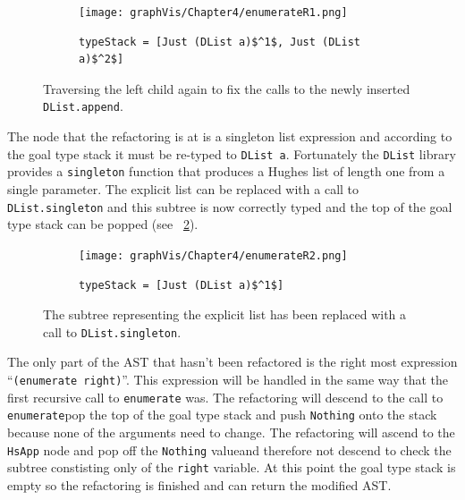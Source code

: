 \begin{figure}[t]
	\begin{subfigure}{\linewidth}
		\texttt{[image: graphVis/Chapter4/enumerateR1.png]}
	\end{subfigure}\par\medskip

	\begin{subfigure}{\linewidth}
		\begin{lstlisting}[mathescape]
			typeStack = [Just (DList a)$^1$, Just (DList a)$^2$]
		\end{lstlisting}
	\end{subfigure}\par\medskip
\caption{Traversing the left child again to fix the calls to the newly inserted \texttt{DList.append}.}
\label{enumStateR1}
\end{figure}

The node that the refactoring is at is a singleton list expression and according to the goal type stack it must be re-typed to \texttt{DList a}. Fortunately the \texttt{DList} library provides a \texttt{singleton} function that produces a Hughes list of length one from a single parameter. The explicit list can be replaced with a call to \texttt{DList.singleton} and this subtree is now correctly typed and the top of the goal type stack can be popped (see \DIFdelbegin {}\DIFdelend \DIFaddbegin {}\DIFaddend ~\ref{enumStateR2}).

\begin{figure}[t]
	\begin{subfigure}{\linewidth}
		\texttt{[image: graphVis/Chapter4/enumerateR2.png]}
	\end{subfigure}\par\medskip

	\begin{subfigure}{\linewidth}
		\begin{lstlisting}[mathescape]
			typeStack = [Just (DList a)$^1$]
		\end{lstlisting}
	\end{subfigure}\par\medskip
\caption{The subtree representing the explicit list has been replaced with a call to \texttt{DList.singleton}.}
\label{enumStateR2}
\end{figure}

The only part of the AST that hasn't been refactored is the right most expression ``\texttt{(enumerate right)}''. This expression will be handled in the same way that the first recursive call to \texttt{enumerate} was. The refactoring will descend to the call to \texttt{enumerate}\DIFaddbegin \DIFadd{, }\DIFaddend pop the top of the goal type stack and push \texttt{Nothing} onto the stack because none of the arguments need to change. The refactoring will ascend to the \texttt{HsApp} node and pop off the \texttt{Nothing} value\DIFaddbegin \DIFadd{, }\DIFaddend and therefore not descend to check the subtree constisting only of the \texttt{right} variable. At this point the goal type stack is empty so the refactoring is finished and can return the modified AST.

